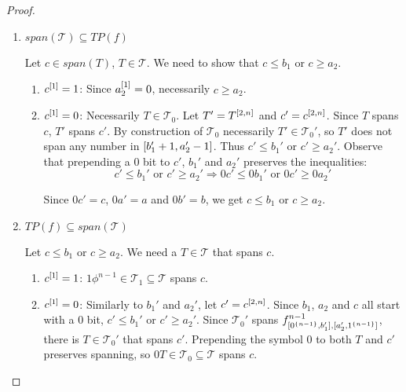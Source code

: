 \begin{proof}
\begin{enumerate}
\item{$span(\mathcal{T}) \subseteq TP(f)$}

Let $c \in span(T)$, $T \in \mathcal{T}$.
We need to show that $c \leq b_1$ or $c \geq a_2$.

\begin{enumerate}
\item $c^{[1]} = 1$: Since $a_2^{[1]} = 0$,
necessarily $c \geq a_2$.

\item $c^{[1]} = 0$: Necessarily $T \in \mathcal{T}_0$.
Let $T' = T^{[2, n]}$ and $c' = c^{[2, n]}$.
Since $T$ spans $c$, $T'$ spans $c'$.
By construction of $\mathcal{T}_0$
necessarily $T' \in \mathcal{T}_0'$,
so $T'$ does not span any number
in $[b_1' + 1, a_2' - 1]$.
Thus $c' \leq b_1'$ or $c' \geq a_2'$.
Observe that prepending a $0$ bit
to $c'$, $b_1'$ and $a_2'$
preserves the inequalities:
\[
c' \leq b_1' \text{ or } c' \geq a_2'
\Rightarrow
0 c' \leq 0 b_1' \text{ or } 0 c' \geq 0 a_2'
\]

Since $0 c' = c$, $0 a' = a$ and $0 b' = b$,
we get $c \leq b_1$ or $c \geq a_2$.
\end{enumerate}

\item{$TP(f) \subseteq span(\mathcal{T})$}

Let $c \leq b_1$ or $c \geq a_2$.
We need a $T \in \mathcal{T}$ that spans $c$.

\begin{enumerate}
\item $c^{[1]} = 1$:
$1 \phi^{n-1} \in \mathcal{T}_1 \subseteq \mathcal{T}$
spans $c$.

\item $c^{[1]} = 0$:
Similarly to $b_1'$ and $a_2'$, let $c' = c^{[2, n]}$.
Since $b_1$, $a_2$ and $c$ all start with a $0$ bit,
$c' \leq b_1'$ or $c' \geq a_2'$.
Since $\mathcal{T}_0'$ spans
$f^{n-1}_{[0^{\{n-1\}}, b_1'], [a_2', 1^{\{n-1\}}]}$,
there is $T \in \mathcal{T}_0'$ that spans $c'$.
Prepending the symbol $0$ to both $T$ and $c'$
preserves spanning,
so $0 T \in \mathcal{T}_0 \subseteq \mathcal{T}$ spans $c$.
\end{enumerate}

\end{enumerate}
\end{proof}

